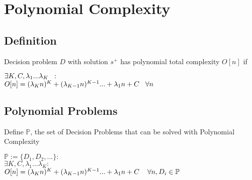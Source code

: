 \documentclass[11pt]{article}
\begin{document}
\newpage
\section{Polynomial Complexity}

\subsection{Definition}
Decision problem $D$ with solution $s^+$ has polynomial total complexity $O[n]$ if
\begin{center}
$\exists K,C,\lambda_1...\lambda_K \hspace{2mm} :$
\\ \vspace{2mm}
$O[n] = (\lambda_K n)^K + (\lambda_{K-1} n)^{K-1}... + \lambda_1 n + C \hspace{3mm} \forall n$
\end{center}





\subsection{Polynomial Problems}
Define $\mathbb{P}$, the set of Decision Problems that can be solved with Polynomial Complexity
\begin{center}
$
\mathbb{P} := \{D_1,D_2,...\} : 
$
\\
$
\exists K,C,\lambda_1...\lambda_K : 
$
\\
$
O[n] = (\lambda_K n)^K + (\lambda_{K-1} n)^{K-1}... + \lambda_1 n + C \hspace{4mm} \forall n, D_i \in \mathbb{P}
$
\end{center}
\end{document}
